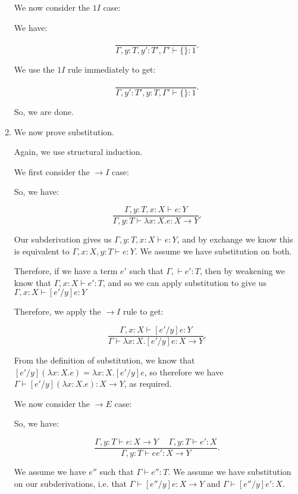 \begin{enumerate}
      We now consider the $1I$ case:

      We have:

      \[
        \frac{}{\Gamma, y : T ,y' : T',  \Gamma' \vdash \{\} : 1}
      .\] 

      We use the $1I$ rule immediately to get:

      \[
        \frac{}{\Gamma, y': T', y : T, \Gamma' \vdash \{\} : 1}
      .\] 

      So, we are done.

    \item
      We now prove substitution.

      Again, we use structural induction.

      We first consider the $\rightarrow I$ case:

      So, we have:

      \[
        \frac{\Gamma, y : T, x : X \vdash e : Y}{\Gamma, y : T \vdash \lambda x : X. e : X \rightarrow Y}
      .\] 

      Our subderivation gives us $\Gamma, y : T, x : X \vdash e : Y$, and by exchange we know this is equivalent to $\Gamma, x : X, y : T \vdash e : Y$. We assume we have substitution on both.

      Therefore, if we have a term $e'$ such that $\Gamma, \vdash e' : T$, then by weakening we know that $\Gamma, x : X \vdash e' : T$, and so we can apply substitution to give us $\Gamma, x : X \vdash [e' / y]e : Y$

      Therefore, we apply the $\rightarrow I$ rule to get:

      \[
        \frac{\Gamma, x : X \vdash [e' / y]e : Y}{\Gamma \vdash \lambda x : X. [e' / y]e : X \rightarrow Y}
      .\] 


      From the definition of substitution, we know that $[e' / y](\lambda x: X . e) = \lambda x : X . [e' / y]e$, so therefore we have $\Gamma \vdash [e' / y](\lambda x : X . e) : X \rightarrow Y$, as required.

      We now consider the $\rightarrow E$ case:

      So, we have:

      \[
        \frac{\Gamma, y : T \vdash e : X \rightarrow Y \hspace{15pt} \Gamma, y : T \vdash e' : X}{\Gamma, y : T \vdash e e' : X \rightarrow Y}
      .\] 

      We assume we have $e''$ such that $\Gamma \vdash e'' : T$. We assume we have substitution on our subderivations, i.e. that $\Gamma \vdash [e'' / y]e : X \rightarrow Y$ and $\Gamma \vdash [e'' / y]e' : X$.


\end{enumerate}
